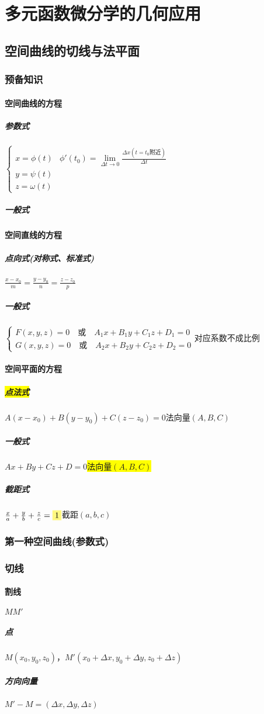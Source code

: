 \documentclass[UTF8,a4paper,12pt,scheme=chinese]{ctexbook}
\newcommand{\hl}[1]{\colorbox{yellow}{#1}}
\newcommand{\hla}[1]{%
	\colorbox{yellow!50}{$\displaystyle#1$}}
\theoremstyle{plain}
\begin{document}
	\section{多元函数微分学的几何应用}
	\subsection{空间曲线的切线与法平面}
	\subsubsection{预备知识}
	\paragraph{空间曲线的方程}
	\subparagraph{参数式}$\left\{\begin{array}{ll}
	x=\phi(t) &\phi'(t_0)=\lim\limits_{\Delta t \rightarrow 0}\frac{\Delta x(t=t_0\mbox{附近})}{\Delta t}\\ 
	y=\psi(t) \\ 
	z=\omega(t)
	\end{array}\right. $
	\subparagraph{一般式}
	\paragraph{空间直线的方程}
	\subparagraph{点向式(对称式、标准式)}$\frac{x-x_0}{m}=\frac{y-y_0}{n}=\frac{z-z_0}{p}$
	\subparagraph{一般式}	$ \left\{\begin{array}{ll}
	F(x,y,z)=0\quad\mbox{或}\quad A_1x+B_1y+C_1z+D_1=0\\ 
	G(x,y,z)=0\quad\mbox{或}\quad A_2x+B_2y+C_2z+D_2=0
	\end{array} \right. $对应系数不成比例
	\paragraph{空间平面的方程}
	\subparagraph{\hl{点法式}} $A(x-x_0)+B(y-y_0)+C(z-z_0)=0$\quad 法向量$ (A,B,C) $
	\subparagraph{一般式} $Ax+By+Cz+D=0$\quad \hl{法向量$ (A,B,C) $}
	\subparagraph{截距式} $ \frac{x}{a}+\frac{y}{b}+\frac{z}{c}=\hla{1} $\quad 截距$ (a,b,c) $
	\subsubsection{第一种空间曲线(参数式)}
	\subsubsection{切线}
	\paragraph{割线}$MM'$
	\subparagraph{点}$M(x_0,y_0,z_0)$，$M'(x_0+\Delta x,y_0+\Delta y,z_0+\Delta z)$
	\subparagraph{方向向量} $M'-M=(\Delta x,\Delta y,\Delta z)$
\end{document}
